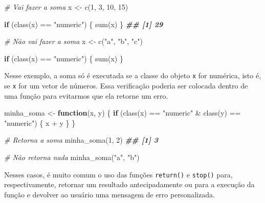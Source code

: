 \documentclass[
]{book}
\newenvironment{Shaded}{\begin{snugshade}}{\end{snugshade}}
\newcommand{\CommentTok}[1]{\textcolor[rgb]{0.56,0.35,0.01}{\textit{#1}}}
\newcommand{\ControlFlowTok}[1]{\textcolor[rgb]{0.13,0.29,0.53}{\textbf{#1}}}
\newcommand{\DecValTok}[1]{\textcolor[rgb]{0.00,0.00,0.81}{#1}}
\newcommand{\DocumentationTok}[1]{\textcolor[rgb]{0.56,0.35,0.01}{\textbf{\textit{#1}}}}
\newcommand{\FunctionTok}[1]{\textcolor[rgb]{0.00,0.00,0.00}{#1}}
\newcommand{\NormalTok}[1]{#1}
\newcommand{\OtherTok}[1]{\textcolor[rgb]{0.56,0.35,0.01}{#1}}
\newcommand{\SpecialCharTok}[1]{\textcolor[rgb]{0.00,0.00,0.00}{#1}}
\newcommand{\StringTok}[1]{\textcolor[rgb]{0.31,0.60,0.02}{#1}}
\begin{document}
\begin{Shaded}
\begin{Highlighting}[]
\CommentTok{\# Vai fazer  a soma}
\NormalTok{x }\OtherTok{\textless{}{-}} \FunctionTok{c}\NormalTok{(}\DecValTok{1}\NormalTok{, }\DecValTok{3}\NormalTok{, }\DecValTok{10}\NormalTok{, }\DecValTok{15}\NormalTok{)}

\ControlFlowTok{if}\NormalTok{ (}\FunctionTok{class}\NormalTok{(x) }\SpecialCharTok{==} \StringTok{"numeric"}\NormalTok{) \{}
  \FunctionTok{sum}\NormalTok{(x)}
\NormalTok{\}}
\DocumentationTok{\#\# [1] 29}

\CommentTok{\# Não vai fazer a soma}
\NormalTok{x }\OtherTok{\textless{}{-}} \FunctionTok{c}\NormalTok{(}\StringTok{"a"}\NormalTok{, }\StringTok{"b"}\NormalTok{, }\StringTok{"c"}\NormalTok{)}

\ControlFlowTok{if}\NormalTok{ (}\FunctionTok{class}\NormalTok{(x) }\SpecialCharTok{==} \StringTok{"numeric"}\NormalTok{) \{}
  \FunctionTok{sum}\NormalTok{(x)}
\NormalTok{\}}
\end{Highlighting}
\end{Shaded}

Nesse exemplo, a soma só é executada se a classe do objeto \texttt{x} for numérica, isto é, se \texttt{x} for um vetor de números. Essa verificação poderia ser colocada dentro de uma função para evitarmos que ela retorne um erro.

\begin{Shaded}
\begin{Highlighting}[]
\NormalTok{minha\_soma }\OtherTok{\textless{}{-}} \ControlFlowTok{function}\NormalTok{(x, y) \{}
  \ControlFlowTok{if}\NormalTok{ (}\FunctionTok{class}\NormalTok{(x) }\SpecialCharTok{==} \StringTok{"numeric"} \SpecialCharTok{\&} \FunctionTok{class}\NormalTok{(y) }\SpecialCharTok{==} \StringTok{"numeric"}\NormalTok{) \{}
\NormalTok{     x }\SpecialCharTok{+}\NormalTok{ y}
\NormalTok{  \}}
\NormalTok{\}}

\CommentTok{\# Retorna a soma}
\FunctionTok{minha\_soma}\NormalTok{(}\DecValTok{1}\NormalTok{, }\DecValTok{2}\NormalTok{)}
\DocumentationTok{\#\# [1] 3}

\CommentTok{\# Não retorna nada}
\FunctionTok{minha\_soma}\NormalTok{(}\StringTok{"a"}\NormalTok{, }\StringTok{"b"}\NormalTok{)}
\end{Highlighting}
\end{Shaded}

Nesses casos, é muito comum o uso das funções \texttt{return()} e \texttt{stop()} para, respectivamente, retornar um resultado antecipadamente ou para a execução da função e devolver ao usuário uma mensagem de erro personalizada.
\end{document}
